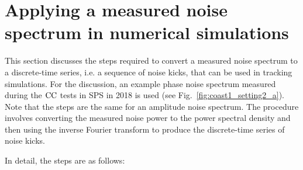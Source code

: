 
\section{Applying a measured noise spectrum in numerical simulations}\label{sec:measured_spectra_to_time_series}

This section discusses the steps required to convert a measured noise spectrum to a discrete-time series, i.e. a sequence of noise kicks, that can be used in tracking simulations. For the discussion, an example phase noise spectrum measured during the ${\mathrm{CC}}$ tests in SPS in 2018 is used (see Fig.~\ref{fig:coast1_setting2_a}). Note that the steps are the same for an amplitude noise spectrum. The procedure involves converting the measured noise power to the power spectral density and then using the inverse Fourier transform to produce the discrete-time series of noise kicks. 

In detail, the steps are as follows:


